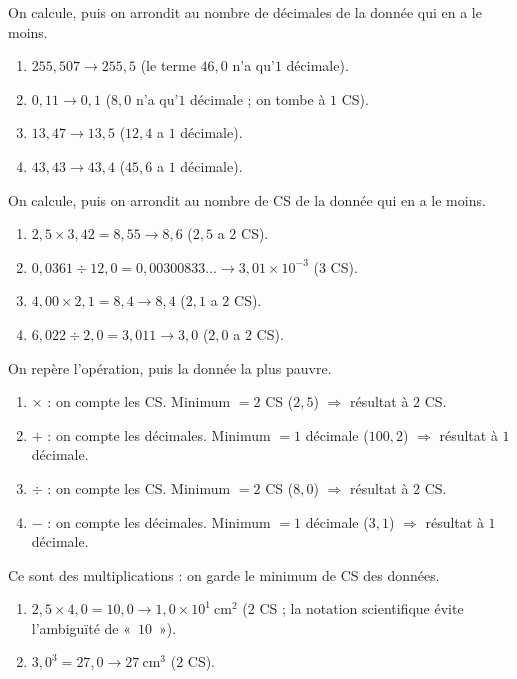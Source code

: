 \documentclass[11pt,a4paper]{article}
\begin{document}
\begin{corrige}
On calcule, puis on arrondit au nombre de décimales de la donnée qui en a le moins.
\begin{enumerate}[label=\alph*)]
  \item $255,507 \to \boxed{255,5}$ (le terme $46,0$ n'a qu'$1$ décimale).
  \item $0,11 \to \boxed{0,1}$ ($8,0$ n'a qu'$1$ décimale ; on tombe à $1$ CS).
  \item $13,47 \to \boxed{13,5}$ ($12,4$ a $1$ décimale).
  \item $43,43 \to \boxed{43,4}$ ($45,6$ a $1$ décimale).
\end{enumerate}
\end{corrige}

\begin{corrige}
On calcule, puis on arrondit au nombre de CS de la donnée qui en a le moins.
\begin{enumerate}[label=\alph*)]
  \item $2,5\times3,42 = 8,55 \to \boxed{8,6}$ ($2,5$ a $2$ CS).
  \item $0,0361\div12,0 = 0,00300833\ldots \to \boxed{3,01\times10^{-3}}$ ($3$ CS).
  \item $4,00\times2,1 = 8,4 \to \boxed{8,4}$ ($2,1$ a $2$ CS).
  \item $6,022\div2,0 = 3,011 \to \boxed{3,0}$ ($2,0$ a $2$ CS).
\end{enumerate}
\end{corrige}

\begin{corrige}
On repère l'opération, puis la donnée la plus pauvre.
\begin{enumerate}[label=\alph*)]
  \item $\times$ : on compte les CS. Minimum $= 2$ CS ($2,5$) $\Rightarrow$ résultat à $2$ CS.
  \item $+$ : on compte les décimales. Minimum $= 1$ décimale ($100,2$) $\Rightarrow$ résultat à $1$ décimale.
  \item $\div$ : on compte les CS. Minimum $= 2$ CS ($8,0$) $\Rightarrow$ résultat à $2$ CS.
  \item $-$ : on compte les décimales. Minimum $= 1$ décimale ($3,1$) $\Rightarrow$ résultat à $1$ décimale.
\end{enumerate}
\end{corrige}

\begin{corrige}
Ce sont des multiplications : on garde le minimum de CS des données.
\begin{enumerate}[label=\alph*)]
  \item $2,5\times4,0 = 10,0 \to \boxed{1,0\times10^{1}\ \si{\centi\metre\squared}}$ ($2$ CS ; la notation
        scientifique évite l'ambiguïté de «~$10$~»).
  \item $3,0^{3} = 27,0 \to \boxed{\qty{27}{\centi\metre\cubed}}$ ($2$ CS).
\end{enumerate}
\end{corrige}
\end{document}
